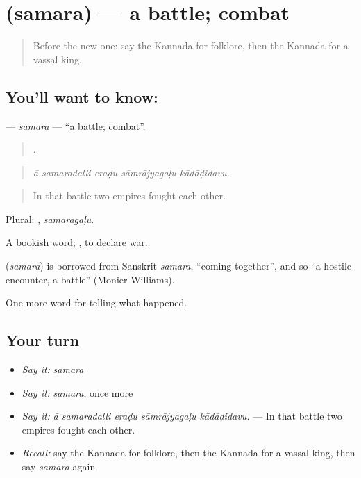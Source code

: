 \section[\texorpdfstring{\kn{ಸಮರ} (samara)}{ಸಮರ (samara)}]{ (samara) — a battle; combat}

\label{lesson:KA-C356-samara}



\begin{quote}
Before the new one: say the Kannada for folklore, then the Kannada for a vassal king.
\end{quote}

\subsection*{You'll want to know: }
\textbf{} — \emph{samara} — \textquotedblleft{}a battle; combat\textquotedblright{}.

\begin{quote}
    .
\end{quote}

\begin{quote}
\emph{ā samaradalli eraḍu sāmrājyagaḷu kādāḍidavu.}
\end{quote}

\begin{quote}
In that battle two empires fought each other.
\end{quote}

Plural: , \emph{samaragaḷu}.

A bookish word;  , to declare war.

\begin{cousinweb}
\textbf{} (\emph{samara}) is borrowed from Sanskrit \emph{samara}, \textquotedblleft{}coming together\textquotedblright{}, and so \textquotedblleft{}a hostile encounter, a battle\textquotedblright{} (Monier-Williams).
\end{cousinweb}

\begin{grammarlens}[title={What you've built}]
One more word for telling what happened.
\end{grammarlens}

\subsection*{Your turn}
\begin{itemize}
\raggedright
  \item \emph{Say it:} \emph{samara}
  \item \emph{Say it:} \emph{samara}, once more
  \item \emph{Say it:} \emph{ā samaradalli eraḍu sāmrājyagaḷu kādāḍidavu.} — In that battle two empires fought each other.
  \item \emph{Recall:} say the Kannada for folklore, then the Kannada for a vassal king, then say \emph{samara} again
\end{itemize}

